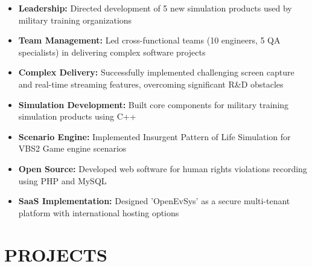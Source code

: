 \documentclass{fullstackdeveloper-ats}
\begin{document}
\begin{itemize}
    \item \textbf{Leadership:} Directed development of 5 new simulation products used by military training organizations
    \item \textbf{Team Management:} Led cross-functional teams (10 engineers, 5 QA specialists) in delivering complex software projects
    \item \textbf{Complex Delivery:} Successfully implemented challenging screen capture and real-time streaming features, overcoming significant R\&D obstacles
\end{itemize}


\begin{itemize}
    \item \textbf{Simulation Development:} Built core components for military training simulation products using C++
    \item \textbf{Scenario Engine:} Implemented Insurgent Pattern of Life Simulation for VBS2 Game engine scenarios
\end{itemize}


\begin{itemize}
    \item \textbf{Open Source:} Developed web software for human rights violations recording using PHP and MySQL
    \item \textbf{SaaS Implementation:} Designed 'OpenEvSys' as a secure multi-tenant platform with international hosting options
\end{itemize}

\section{PROJECTS}

\noindent{}\\
\\
\noindent{}
\end{document}
